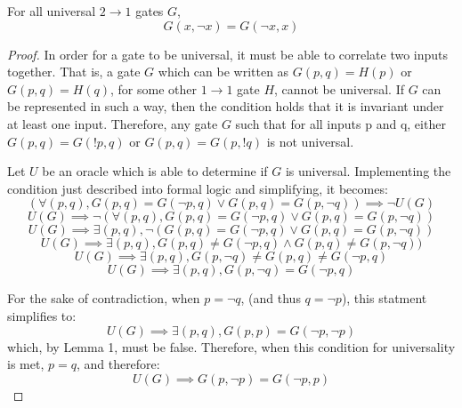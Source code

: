 \documentclass[12pt]{article}
\begin{document}
\begin{lemma}
    For all universal $2 \to 1$ gates $G$,
    $$G(x, \neg x) = G(\neg x, x)$$
\end{lemma}

\begin{proof}
	In order for a gate to be universal, it must be able to correlate two inputs together. That is, a gate $G$ which can be written as $G(p, q) = H(p)$ or $G(p, q) = H(q)$, for some other $1 \to 1$ gate $H$, cannot be universal. If $G$ can be represented in such a way, then the condition holds that it is invariant under at least one input. Therefore, any gate $G$ such that for all inputs p and q, either $G(p, q) = G(!p, q)$ or $G(p, q) = G(p, !q)$ is not universal.

    Let $U$ be an oracle which is able to determine if $G$ is universal. Implementing the condition just described into formal logic and simplifying, it becomes:
    $$(\forall (p, q), G(p, q) = G(\neg p, q) \lor G(p, q) = G(p, \neg q)) \implies \neg U(G)$$
    $$U(G) \implies \neg (\forall (p, q), G(p, q) = G(\neg p, q) \lor G(p, q) = G(p, \neg q))$$
    $$U(G) \implies \exists (p, q), \neg (G(p, q) = G(\neg p, q) \lor G(p, q) = G(p, \neg q))$$
    $$U(G) \implies \exists (p, q), G(p, q) \ne G(\neg p, q) \land G(p, q) \ne G(p, \neg q))$$
    $$U(G) \implies \exists (p, q), G(p, \neg q) \ne G(p, q) \ne G(\neg p, q)$$
    $$U(G) \implies \exists (p, q), G(p, \neg q) = G(\neg p, q)$$

    For the sake of contradiction, when $p = \neg q$, (and thus $q = \neg p$), this statment simplifies to:
    $$U(G) \implies \exists (p, q), G(p, p) = G(\neg p, \neg p)$$
    which, by Lemma 1, must be false. Therefore, when this condition for universality is met, $p = q$, and therefore:
    $$U(G) \implies G(p, \neg p) = G(\neg p, p)$$
\end{proof}
\end{document}
